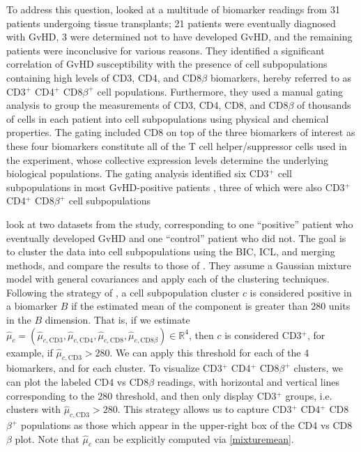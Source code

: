 \documentclass{uwstat572}
\newcommand*\reals{\mathbb{R}}
\newcommand*\estim[1]{\widehat{#1}}
\renewcommand\;{\,}
\begin{document}
To address this question, \cite{Brinkman07} looked at a multitude of biomarker readings from 31 patients undergoing tissue transplants; 21 patients were eventually diagnosed with GvHD, 3 were determined not to have developed GvHD, and the remaining patients were inconclusive for various reasons.
They identified a significant correlation of GvHD susceptibility with the presence of cell subpopulations containing high levels of CD3, CD4, and CD8$\beta$ biomarkers, hereby referred to as CD3$^+$ CD4$^+$ CD8$\beta^+$ cell populations.
Furthermore, they used a manual gating analysis to group the measurements of CD3, CD4, CD8, and CD8$\beta$ of thousands of cells in each patient into cell subpopulations using physical and chemical properties.
The gating included CD8 on top of the three biomarkers of interest as these four biomarkers constitute all of the T cell helper/suppressor cells used in the experiment, whose collective expression levels determine the underlying biological populations.
The gating analysis identified six CD3$^+$ cell subpopulations in most GvHD-positive patients , three of which were also 
CD3$^+$ CD4$^+$ CD8$\beta^+$ cell subpopulations

\cite{Baudry10} look at two datasets from the study, corresponding to one ``positive'' patient who eventually developed GvHD and one ``control'' patient who did not.
The goal is to cluster the data into cell subpopulations using the BIC, ICL, and merging methods, and compare the results to those of \cite{Brinkman07}.
They assume a Gaussian mixture model with general covariances and apply each of the clustering techniques.
Following the strategy of \cite{Lo08}, a cell subpopulation cluster $c$ is considered positive in a biomarker $B$ if the estimated mean of the component is greater than 280 units in the $B$ dimension.
That is, if we estimate $\estim\mu_c = \left(\estim \mu_{c, \text{CD3}}, \estim \mu_{c, \text{CD4}}, \estim\mu_{c, \text{CD8}}, \estim\mu_{c, \text{CD8$\beta$}}\right) \in \reals^4$, then $c$ is considered CD3$^+$, for example, if $\estim\mu_{c, \text{CD3}} > 280$.
We can apply this threshold for each of the 4 biomarkers, and for each cluster.
To visualize CD3$^+$ CD4$^+$ CD8$\beta^+$ clusters, we can plot the labeled CD4 vs CD8$\beta$ readings, with horizontal and vertical lines corresponding to the 280 threshold, and then only display CD3$^+$ groups, i.e. clusters with $\estim\mu_{c, \text{CD3}} > 280$.
This strategy allows us to capture CD3$^+$ CD4$^+$ CD8$\beta^+$ populations as those which appear in the upper-right box of the CD4 vs CD8$\beta$ plot.
Note that $\estim\mu_c$ can be explicitly computed via \eqref{mixturemean}.
\end{document}
